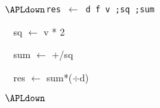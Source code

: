 {\tt $\APLdown$res $\leftarrow$ d f v ;sq ;sum

$\;\;$  sq $\leftarrow$ v * 2

$\;\;$  sum $\leftarrow$ +/sq

$\;\;$  res $\leftarrow$ sum*($\div$d)

$\APLdown$}




\copyrightnotice

\bye

